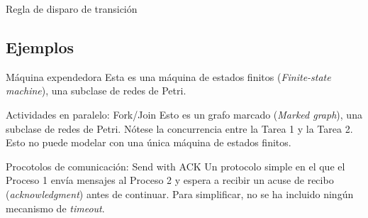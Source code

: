 \documentclass{beamer}
\begin{document}
\begin{frame}{Regla de disparo de transición}
  \begin{figure}[!htb]
    \centering
    
  \end{figure}
\end{frame}

\subsection{Ejemplos}

\begin{frame}{Máquina expendedora}
  \scriptsize
  Esta es una máquina de estados finitos (\emph{Finite-state machine}), una subclase de redes de Petri.

  \begin{figure}
    \centering
    
  \end{figure}
\end{frame}

\begin{frame}{Actividades en paralelo: Fork/Join}
  \scriptsize
  Esto es un grafo marcado (\emph{Marked graph}), una subclase de redes de Petri.
  Nótese la concurrencia entre la Tarea 1 y la Tarea 2.
  Esto no puede modelar con una única máquina de estados finitos.

  \begin{figure}
    \centering
    
  \end{figure}
\end{frame}

\begin{frame}{Procotolos de comunicación: Send with ACK}
  \scriptsize
  Un protocolo simple en el que el Proceso 1 envía mensajes al Proceso 2 y
  espera a recibir un acuse de recibo (\emph{acknowledgment}) antes de continuar.
  Para simplificar, no se ha incluido ningún mecanismo de \emph{timeout}.

  \begin{figure}
    \centering
    
  \end{figure}
\end{frame}
\end{document}
